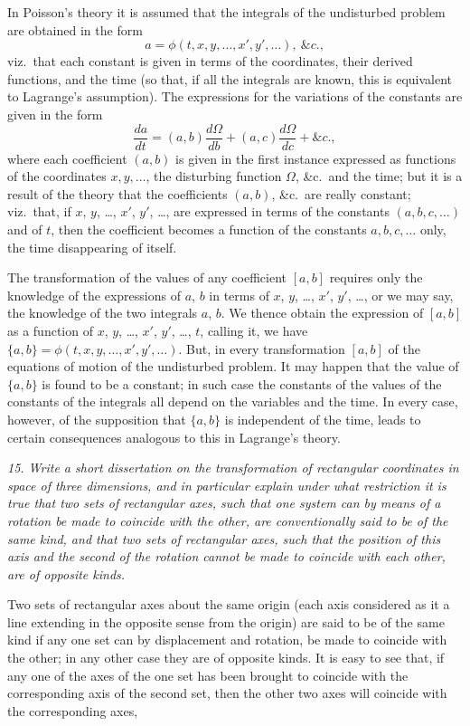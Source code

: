 \documentclass[11pt,a4paper]{book}
\begin{document}
In Poisson's theory it is assumed that the integrals of the undisturbed problem
are obtained in the form
\[
a = \phi(t, x, y, \ldots, x', y', \ldots),\ \&c.,
\]
viz.\ that each constant is given in terms of the coordinates, their derived functions,
and the time (so that, if all the integrals are known, this is equivalent to Lagrange's
assumption). The expressions for the variations of the constants are given in the form
\[
\frac{da}{dt} = (a, b)\frac{d\Omega}{db} + (a, c)\frac{d\Omega}{dc} + \&c.,
\]
where each coefficient $(a, b)$ is given in the first instance expressed as functions of the coordinates
$x, y, \ldots$, the disturbing function $\Omega$, \&c.\ and the time; but it is a result of the theory
that the coefficients $(a, b)$, \&c.\ are really constant; viz.\ that, if $x$, $y$, \ldots, $x'$, $y'$, \ldots, are
expressed in terms of the constants $(a, b, c, \ldots)$ and of $t$, then the coefficient becomes a function of the constants $a, b, c, \ldots$ only, the time disappearing of itself.

The transformation of the values of any coefficient $[a, b]$ requires only the knowledge of
the expressions of $a$, $b$ in terms of $x$, $y$, \ldots, $x'$, $y'$, \ldots, or we may say, the knowledge of the two
integrals $a$, $b$. We thence obtain the expression of $[a, b]$ as a function of $x$, $y$, \ldots, $x'$, $y'$, \ldots,
$t$, calling it, we have $\{a, b\} = \phi(t, x, y, \ldots, x', y', \ldots)$. But, in every transformation $[a, b]$ of the
equations of motion of the undisturbed problem. It may happen that the value of
$\{a, b\}$ is found to be a constant; in such case the constants of the values of the constants
of the integrals all depend on the variables and the time. In every case, however,
of the supposition that $\{a, b\}$ is independent of the time, leads to certain consequences
analogous to this in Lagrange's theory.

\textit{15. Write a short dissertation on the transformation of rectangular coordinates in
space of three dimensions, and in particular explain under what restriction it is true
that two sets of rectangular axes, such that one system can by means of a rotation be
made to coincide with the other, are conventionally said to be of the same kind, and that
two sets of rectangular axes, such that the position of this axis and the second of the
rotation cannot be made to coincide with each other, are of opposite kinds.}

Two sets of rectangular axes about the same origin (each axis considered as it
a line extending in the opposite sense from the origin) are said to be of the same
kind if any one set can by displacement and rotation, be made to coincide with the
other; in any other case they are of opposite kinds. It is easy to see that, if any one
of the axes of the one set has been brought to coincide with the corresponding axis
of the second set, then the other two axes will coincide with the corresponding axes,
\end{document}
